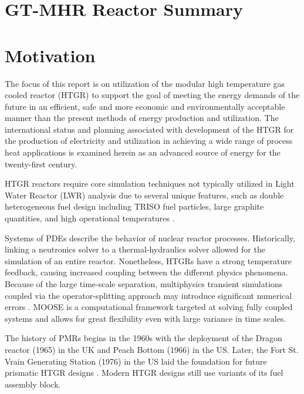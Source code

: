 \documentclass[11pt,letterpaper]{article}
\begin{document}
\section{GT-MHR Reactor Summary}


\section{Motivation}

The focus of this report is on utilization of the modular high temperature gas cooled
reactor (HTGR) to support the goal of meeting the energy demands of the future in an
efficient, safe and more economic and environmentally acceptable manner than the present
methods of energy production and utilization. The international status and planning associated
with development of the HTGR for the production of electricity and utilization in achieving a
wide range of process heat applications is examined herein as an advanced source of energy
for the twenty-first century.
\cite{iaea_current_2001}

HTGR reactors require core simulation techniques not typically utilized in Light Water Reactor (LWR) analysis due to several unique features, such as double heterogeneous fuel design including \gls{TRISO} fuel particles, large graphite quantities, and high operational temperatures \cite{bostelmann_criticality_2016}.


Systems of \glspl{PDE} describe the behavior of nuclear reactor processes.
Historically, linking a neutronics solver to a thermal-hydraulics solver allowed for the simulation of an entire reactor.
Nonetheless, \glspl{HTGR} have a strong temperature feedback, causing increased coupling between the different physics phenomena.
Because of the large time-scale separation, multiphysics transient simulations coupled via the operator-splitting approach may introduce significant numerical errors \cite{ragusa_consistent_2009} \cite{park_tightly_2010}.
\gls{MOOSE} \cite{gaston_moose_2009} is a computational framework targeted at solving fully coupled systems and allows for great flexibility even with large variance in time scales.


The history of \glspl{PMR} begins in the 1960s with the deployment of the Dragon reactor (1965) in the \gls{UK} and Peach Bottom (1966) in the \gls{US}.
Later, the Fort St. Vrain Generating Station (1976) in the \gls{US} laid the foundation for future prismatic \gls{HTGR} designs \cite{aris_iaea_general_2013}.
Modern \gls{HTGR} designs still use variants of its fuel assembly block.
\end{document}
